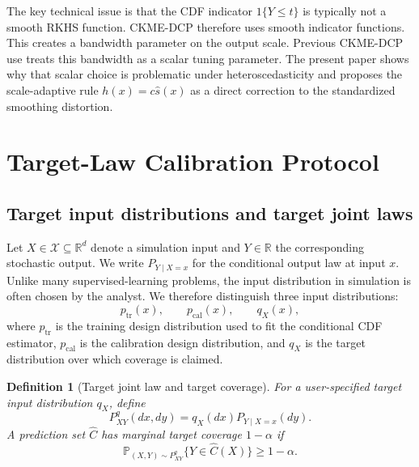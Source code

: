 \documentclass[11pt]{article}
\newtheorem{definition}{Definition}
\newcommand{\Xcal}{\mathcal X}
\newcommand{\Pp}{\mathbb P}
\newcommand{\R}{\mathbb R}
\begin{document}
The key technical issue is that the CDF indicator \(1\{Y\le t\}\) is typically not a smooth RKHS function. CKME-DCP therefore uses smooth indicator functions. This creates a bandwidth parameter on the output scale. Previous CKME-DCP use treats this bandwidth as a scalar tuning parameter. The present paper shows why that scalar choice is problematic under heteroscedasticity and proposes the scale-adaptive rule \(h(x)=c\widehat s(x)\) as a direct correction to the standardized smoothing distortion.

\section{Target-Law Calibration Protocol}
\label{sec:target}

\subsection{Target input distributions and target joint laws}

Let \(X\in\Xcal\subseteq\R^d\) denote a simulation input and \(Y\in\R\) the corresponding stochastic output. We write \(P_{Y\mid X=x}\) for the conditional output law at input \(x\). Unlike many supervised-learning problems, the input distribution in simulation is often chosen by the analyst. We therefore distinguish three input distributions:
\[
  p_{\mathrm{tr}}(x), \qquad p_{\mathrm{cal}}(x), \qquad q_X(x),
\]
where \(p_{\mathrm{tr}}\) is the training design distribution used to fit the conditional CDF estimator, \(p_{\mathrm{cal}}\) is the calibration design distribution, and \(q_X\) is the target distribution over which coverage is claimed.

\begin{definition}[Target joint law and target coverage]
For a user-specified target input distribution \(q_X\), define
\[
  P^q_{XY}(dx,dy)=q_X(dx)P_{Y\mid X=x}(dy).
\]
A prediction set \(\widehat C\) has marginal target coverage \(1-\alpha\) if
\[
  \Pp_{(X,Y)\sim P^q_{XY}}\{Y\in \widehat C(X)\}\ge 1-\alpha .
\]
\end{definition}
\end{document}
